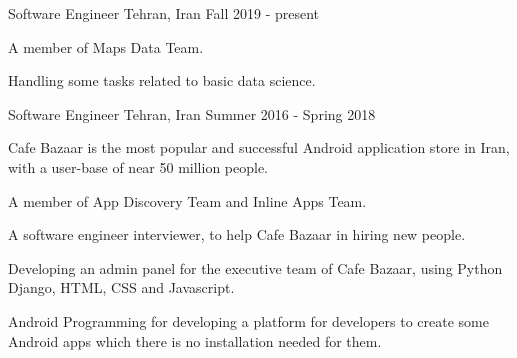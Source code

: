 

\begin{cventries}

 \cventry
    {Software Engineer} %
    {} %
    {Tehran, Iran} %
    {Fall 2019 - present} %
    {
      \begin{cvitems} %
        \item {A member of Maps Data Team.}
        \item {Handling some tasks related to basic data science.}
      \end{cvitems}
    }

  \cventry
    {Software Engineer} %
    {} %
    {Tehran, Iran} %
    {Summer 2016 - Spring 2018} %
    {
      \begin{cvitems} %
        \item {Cafe Bazaar is the most popular and successful Android application store in Iran, with a user-base of near 50 million people.}
        \item {A member of App Discovery Team and Inline Apps Team.}
        \item {A software engineer interviewer, to help Cafe Bazaar in hiring new people.}
        \item {Developing an admin panel for the executive team of Cafe Bazaar, using Python Django, HTML, CSS and Javascript.}
        \item {Android Programming for developing a platform for developers to create some Android apps which there is no installation needed for them.}
      \end{cvitems}
    }


\end{cventries}
